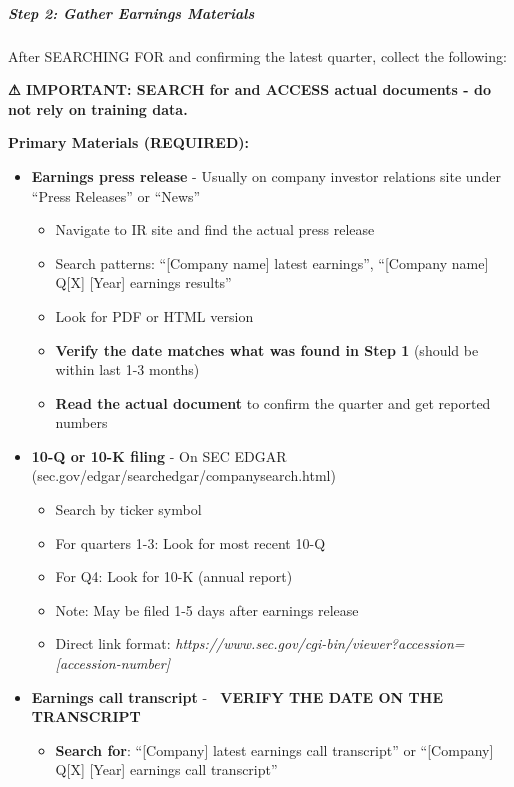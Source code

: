 \documentclass[11pt]{article}
\begin{document}
\subparagraph{Step 2: Gather Earnings Materials}\mbox{}\par

After SEARCHING FOR and confirming the latest quarter, collect the following:


\textbf{⚠ IMPORTANT: SEARCH for and ACCESS actual documents - do not rely on training data.}


\textbf{Primary Materials (REQUIRED):}

\begin{itemize}[leftmargin=*,itemsep=2pt,topsep=2pt]
\item {} \textbf{Earnings press release} - Usually on company investor relations site under ``Press Releases'' or ``News''
\begin{itemize}[leftmargin=*,itemsep=2pt,topsep=2pt]
\item {} Navigate to IR site and find the actual press release
\item {} Search patterns: ``[Company name] latest earnings'', ``[Company name] Q[X] [Year] earnings results''
\item {} Look for PDF or HTML version
\item {} \textbf{Verify the date matches what was found in Step 1} (should be within last 1-3 months)
\item {} \textbf{Read the actual document} to confirm the quarter and get reported numbers
\end{itemize}
\item {} \textbf{10-Q or 10-K filing} - On SEC EDGAR (sec.gov/edgar/searchedgar/companysearch.html)
\begin{itemize}[leftmargin=*,itemsep=2pt,topsep=2pt]
\item {} Search by ticker symbol
\item {} For quarters 1-3: Look for most recent 10-Q
\item {} For Q4: Look for 10-K (annual report)
\item {} Note: May be filed 1-5 days after earnings release
\item {} Direct link format: \emph{https://www.sec.gov/cgi-bin/viewer?accession=[accession-number]}
\end{itemize}
\item {} \textbf{Earnings call transcript} - 🚨 \textbf{VERIFY THE DATE ON THE TRANSCRIPT} 🚨
\begin{itemize}[leftmargin=*,itemsep=2pt,topsep=2pt]
\item {} \textbf{Search for}: ``[Company] latest earnings call transcript'' or ``[Company] Q[X] [Year] earnings call transcript''

\end{itemize}
\end{itemize}
\end{document}
